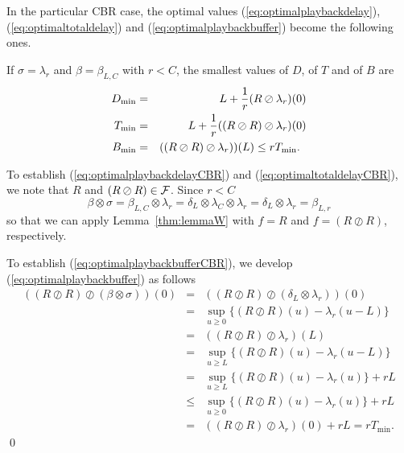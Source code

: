 In the particular CBR case, the optimal values (\ref{eq:optimalplaybackdelay}), (\ref{eq:optimaltotaldelay}) and (\ref{eq:optimalplaybackbuffer})
become the following ones.

\begin{theorem}
If $\sigma = \lambda_r$ and  $\beta = \beta_{L,C}$ with $r < C$, the smallest values of $D$, of $T$ and of $B$ are
\begin{eqnarray}
 \mylabel{eq:optimalplaybackdelayCBR}
D_{\min} & = & L + \frac{1}{r} (R \oslash \lambda_r)(0) \\
\mylabel{eq:optimaltotaldelayCBR}
T_{\min}  & = &  L + \frac{1}{r} ((R \oslash R)  \oslash \lambda_r)(0) \\
\mylabel{eq:optimalplaybackbufferCBR}
B_{\min}  & = & ((R \oslash R) \oslash \lambda_r))(L) \leq rT_{\min}.\;\;
\end{eqnarray}
\end{theorem}

\pr
To establish (\ref{eq:optimalplaybackdelayCBR}) and (\ref{eq:optimaltotaldelayCBR}),
we note that $R$ and $(R \oslash R) \in \mathcal F$. Since $r < C$
$$ \beta \otimes \sigma  =  \beta_{L,C} \otimes \lambda_r = \delta_L \otimes \lambda_C \otimes \lambda_r
     =   \delta_L \otimes \lambda_r = \beta_{L,r} $$
so that we can apply Lemma~\ref{thm:lemmaW} with $f = R$ and $f =(R \oslash R)$, respectively.

To establish (\ref{eq:optimalplaybackbufferCBR}), we develop (\ref{eq:optimalplaybackbuffer}) as follows
\begin{eqnarray*}
((R \oslash R) \oslash (\beta \otimes \sigma))(0)
& = & ((R \oslash R) \oslash (\delta_L \otimes \lambda_r))(0) \\
& = & \sup_{u \geq 0} \{ (R \oslash R)(u) - \lambda_r(u-L)\} \\
& = & ((R \oslash R) \oslash \lambda_r)(L) \\
& = & \sup_{u \geq L} \{ (R \oslash R)(u) - \lambda_r(u-L)\} \\
& = & \sup_{u \geq L} \{ (R \oslash R)(u) - \lambda_r(u)\} + rL \\
& \leq & \sup_{u \geq 0} \{ (R \oslash R)(u) - \lambda_r(u)\} + rL \\
& = &  ((R \oslash R) \oslash \lambda_r)(0) + rL = rT_{\min}.
\end{eqnarray*}
\qed


